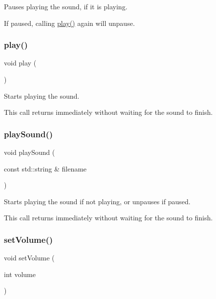 Pauses playing the sound, if it is playing. 

If paused, calling \mbox{\hyperlink{classSound_a6d58098c6cf63c241ed03bc797256bb1}{play()}} again will unpause. \mbox{\label{classSound_a6d58098c6cf63c241ed03bc797256bb1}} 
\subsubsection{\texorpdfstring{play()}{play()}}
{\footnotesize\ttfamily void play (\begin{DoxyParamCaption}{ }\end{DoxyParamCaption})}



Starts playing the sound. 

This call returns immediately without waiting for the sound to finish. \mbox{\label{classSound_a33b24517799bad56a19cfe26b3f962ae}} 
\subsubsection{\texorpdfstring{play\+Sound()}{playSound()}}
{\footnotesize\ttfamily void play\+Sound (\begin{DoxyParamCaption}\item[{const std\+::string \&}]{filename }\end{DoxyParamCaption})\hspace{0.3cm}{\ttfamily [static]}}



Starts playing the sound if not playing, or unpauses if paused. 

This call returns immediately without waiting for the sound to finish. \mbox{\label{classSound_a6715d5315d47c73b3838f2cb771e7b58}} 
\subsubsection{\texorpdfstring{set\+Volume()}{setVolume()}}
{\footnotesize\ttfamily void set\+Volume (\begin{DoxyParamCaption}\item[{int}]{volume }\end{DoxyParamCaption})\hspace{0.3cm}{\ttfamily [static]}}



